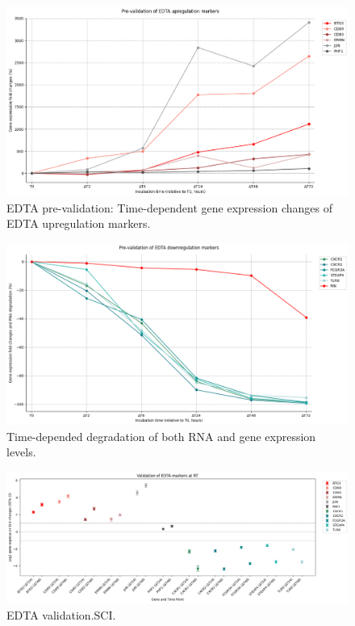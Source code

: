 \documentclass[fleqn,10pt]{wlscirep}
\begin{document}
\begin{figure}[ht]
    \centering
    \includegraphics[width=\linewidth]{figure2}
    \caption{EDTA pre-validation: Time-dependent gene expression changes of EDTA upregulation markers.}
    \label{fig:figure2}
    \end{figure}

\begin{figure}[ht]
    \centering
    \includegraphics[width=\linewidth]{figure3}
    \caption{Time-depended degradation of both RNA and gene expression levels.}
    \label{fig:figure3}
    \end{figure}

\begin{figure}[ht]
    \centering
    \includegraphics[width=\linewidth]{figure4}
    \caption{EDTA validation.SCI.}
    \label{fig:figure4}
    \end{figure}
\end{document}
